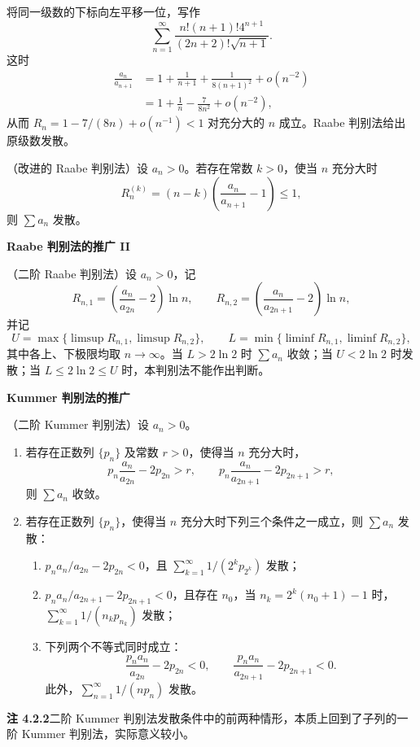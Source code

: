 将同一级数的下标向左平移一位，写作
\[
\sum_{n=1}^{\infty}\frac{n!(n+1)!4^{n+1}}{(2n+2)!\sqrt{n+1}}.
\]
这时
\begin{align*}
\frac{a_n}{a_{n+1}}
&=1+\frac1{n+1}+\frac1{8(n+1)^2}+o(n^{-2})\\
&=1+\frac1n-\frac7{8n^2}+o(n^{-2}),
\end{align*}
从而 $R_n=1-7/(8n)+o(n^{-1})<1$ 对充分大的 $n$ 成立。Raabe 判别法给出原级数发散。

（改进的 Raabe 判别法）设 $a_n>0$。若存在常数 $k>0$，使当 $n$ 充分大时
\[
R_n^{(k)}=(n-k)\left(\frac{a_n}{a_{n+1}}-1\right)\leq1,
\]
则 $\sum a_n$ 发散。

\noindent\textbf{Raabe 判别法的推广 II}

（二阶 Raabe 判别法）设 $a_n>0$，记
\[
R_{n,1}=\left(\frac{a_n}{a_{2n}}-2\right)\ln n,
\qquad
R_{n,2}=\left(\frac{a_n}{a_{2n+1}}-2\right)\ln n,
\]
并记
\[
U=\max\{\limsup R_{n,1},\limsup R_{n,2}\},\qquad
L=\min\{\liminf R_{n,1},\liminf R_{n,2}\},
\]
其中各上、下极限均取 $n\to\infty$。当 $L>2\ln2$ 时 $\sum a_n$ 收敛；当 $U<2\ln2$ 时发散；当 $L\leq2\ln2\leq U$ 时，本判别法不能作出判断。

\noindent\textbf{Kummer 判别法的推广}

（二阶 Kummer 判别法）设 $a_n>0$。
\begin{enumerate}[label=（\arabic*）,leftmargin=3em]
\item 若存在正数列 $\{p_n\}$ 及常数 $r>0$，使得当 $n$ 充分大时，
\[
p_n\frac{a_n}{a_{2n}}-2p_{2n}>r,
\qquad
p_n\frac{a_n}{a_{2n+1}}-2p_{2n+1}>r,
\]
则 $\sum a_n$ 收敛。
\item 若存在正数列 $\{p_n\}$，使得当 $n$ 充分大时下列三个条件之一成立，则 $\sum a_n$ 发散：
\begin{enumerate}[label=（\roman*）,leftmargin=3em]
\item $p_n a_n/a_{2n}-2p_{2n}<0$，且 $\sum_{k=1}^{\infty}1/(2^kp_{2^k})$ 发散；
\item $p_n a_n/a_{2n+1}-2p_{2n+1}<0$，且存在 $n_0$，当 $n_k=2^k(n_0+1)-1$ 时，$\sum_{k=1}^{\infty}1/(n_kp_{n_k})$ 发散；
\item 下列两个不等式同时成立：
\[
\frac{p_na_n}{a_{2n}}-2p_{2n}<0,\qquad
\frac{p_na_n}{a_{2n+1}}-2p_{2n+1}<0.
\]
此外，$\sum_{n=1}^{\infty}1/(np_n)$ 发散。
\end{enumerate}
\end{enumerate}

\noindent\textbf{注 4.2.2}\quad 二阶 Kummer 判别法发散条件中的前两种情形，本质上回到了子列的一阶 Kummer 判别法，实际意义较小。
